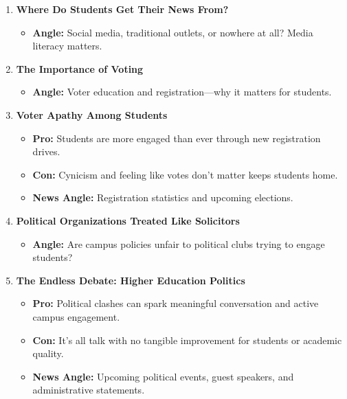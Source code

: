 \documentclass{article}
\begin{document}
\begin{enumerate}[leftmargin=*]
    \item \textbf{Where Do Students Get Their News From?}
    \begin{itemize}
        \item \textbf{Angle:} Social media, traditional outlets, or nowhere at all? Media literacy matters.
    \end{itemize}

    \item \textbf{The Importance of Voting}
    \begin{itemize}
        \item \textbf{Angle:} Voter education and registration---why it matters for students.
    \end{itemize}

    \item \textbf{Voter Apathy Among Students}
    \begin{itemize}
        \item \textbf{Pro:} Students are more engaged than ever through new registration drives.
        \item \textbf{Con:} Cynicism and feeling like votes don't matter keeps students home.
        \item \textbf{News Angle:} Registration statistics and upcoming elections.
    \end{itemize}

    \item \textbf{Political Organizations Treated Like Solicitors}
    \begin{itemize}
        \item \textbf{Angle:} Are campus policies unfair to political clubs trying to engage students?
    \end{itemize}

    \item \textbf{The Endless Debate: Higher Education Politics}
    \begin{itemize}
        \item \textbf{Pro:} Political clashes can spark meaningful conversation and active campus engagement.
        \item \textbf{Con:} It's all talk with no tangible improvement for students or academic quality.
        \item \textbf{News Angle:} Upcoming political events, guest speakers, and administrative statements.
    \end{itemize}


\end{enumerate}
\end{document}
